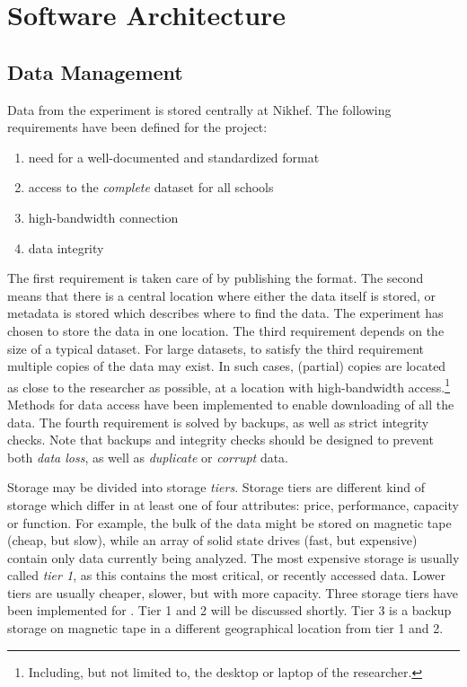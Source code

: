 \chapter{Software Architecture}



\section{Data Management}

Data from the \hisparc experiment is stored centrally at Nikhef. The following
requirements have been defined for the \hisparc project:
\begin{enumerate}
    \item need for a well-documented and standardized format
    \item access to the \emph{complete} dataset for all schools
    \item high-bandwidth connection
    \item data integrity
\end{enumerate}
The first requirement is taken care of by publishing the format.  The second
means that there is a central location where either the data itself is stored,
or metadata is stored which describes where to find the data.  The \hisparc
experiment has chosen to store the data in one location. The third requirement
depends on the size of a typical dataset.  For large datasets, to satisfy
the third requirement multiple copies of the data may exist.  In such
cases, (partial) copies are located as close to the researcher as
possible, at a location with high-bandwidth access.\footnote{Including, but
not limited to, the desktop or laptop of the researcher.}  Methods for
data access have been implemented to enable downloading of all the data.
The fourth requirement is solved by backups, as well as strict integrity
checks.  Note that backups and integrity checks should be designed to
prevent both \emph{data loss}, as well as \emph{duplicate} or
\emph{corrupt} data.

Storage may be divided into storage \emph{tiers}.  Storage tiers are different
kind of storage which differ in at least one of four attributes: price,
performance, capacity or function.  For example, the bulk of the data might be
stored on magnetic tape (cheap, but slow), while an array of solid state drives
(fast, but expensive) contain only data currently being analyzed.  The most
expensive storage is usually called \emph{tier 1}, as this contains the most
critical, or recently accessed data.  Lower tiers are usually cheaper, slower,
but with more capacity. Three storage tiers have been implemented for \hisparc.
Tier 1 and 2 will be discussed shortly. Tier 3 is a backup storage on magnetic
tape in a different geographical location from tier 1 and 2.


